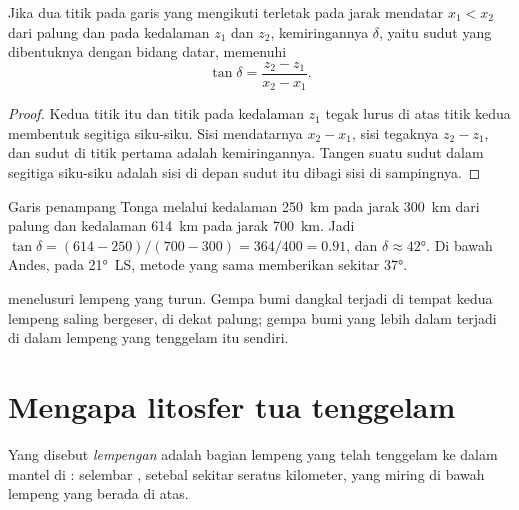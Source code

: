 \begin{proposition}\label{prop:g11:subduction-zones:dip}
Jika dua titik pada garis yang mengikuti  terletak pada
jarak mendatar $x_1 < x_2$ dari palung dan pada kedalaman $z_1$ dan $z_2$,
kemiringannya $\delta$, yaitu sudut yang dibentuknya dengan bidang datar, memenuhi
\[
  \tan \delta = \frac{z_2 - z_1}{x_2 - x_1}.
\]
\end{proposition}

\begin{proof}
Kedua titik itu dan titik pada kedalaman $z_1$ tegak lurus di atas titik kedua
membentuk segitiga siku-siku. Sisi mendatarnya $x_2 - x_1$, sisi tegaknya
$z_2 - z_1$, dan sudut di titik pertama adalah kemiringannya. Tangen suatu sudut
dalam segitiga siku-siku adalah sisi di depan sudut itu dibagi sisi di
sampingnya.
\end{proof}

\begin{example}\label{ex:g11:subduction-zones:dip}
Garis penampang Tonga melalui kedalaman \qty{250}{km} pada jarak \qty{300}{km}
dari palung dan kedalaman \qty{614}{km} pada jarak \qty{700}{km}. Jadi
$\tan\delta = (614 - 250)/(700 - 300) = 364/400 = 0.91$, dan
$\delta \approx \ang{42}$. Di bawah Andes, pada \ang{21}~LS, metode yang sama
memberikan sekitar \ang{37}.
\end{example}

 menelusuri lempeng yang turun. Gempa bumi dangkal terjadi
di tempat kedua lempeng saling bergeser, di dekat palung; gempa bumi yang lebih
dalam terjadi di dalam lempeng yang tenggelam itu sendiri.

\section{Mengapa litosfer tua tenggelam}

\begin{definition}[Lempengan]\label{def:g11:subduction-zones:slab}
Yang disebut \emph{lempengan} adalah bagian lempeng yang telah
tenggelam ke dalam mantel di : selembar , setebal
sekitar seratus kilometer, yang miring di bawah lempeng yang berada di atas.
\end{definition}


